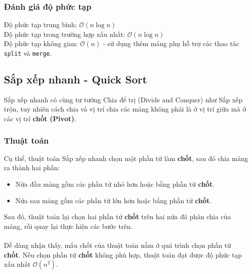 \documentclass[]{article}
\begin{document}
\subsubsection{Đánh giá độ phức tạp}
Độ phức tạp trung bình: $\mathcal{O}(n \log n)$
\\
Độ phức tạp trong trường hợp xấu nhất: $\mathcal{O}(n \log n)$
\\
Độ phức tạp không gian: $\mathcal{O}(n)$ - sử dụng thêm mảng phụ hỗ trợ các thao tác \texttt{split} và \texttt{merge}.
\subsection{Sắp xếp nhanh - Quick Sort}
Sắp xếp nhanh có cùng tư tưởng Chia để trị (Divide and Conquer) như Sắp xếp trộn, tuy nhiên cách chia và vị trí chia các mảng không phải là ở vị trí giữa mà ở các vị trí \textbf{chốt (Pivot)}.
\subsubsection{Thuật toán}
Cụ thể, thuật toán Sắp xếp nhanh chọn một phần tử làm \textbf{chốt}, sau đó chia mảng ra thành hai phần:
\begin{itemize}
\item Nửa đầu mảng gồm các phần tử nhỏ hơn hoặc bằng phần tử \textbf{chốt}.
\item Nửa sau mảng gồm các phần tử lớn hơn hoặc bằng phần tử \textbf{chốt}.
\end{itemize}
Sau đó, thuật toán lại chọn hai phần tử \textbf{chốt} trên hai nửa đã phân chia của mảng, rồi quay lại thực hiện các bước trên.
\\\\
Dễ dàng nhận thấy, mấu chốt của thuật toán nằm ở quá trình chọn phần tử \textbf{chốt}. Nếu chọn phần tử \textbf{chốt} không phù hợp, thuật toán đạt được độ phức tạp xấu nhất $\mathcal{O}(n^2)$.
\end{document}
